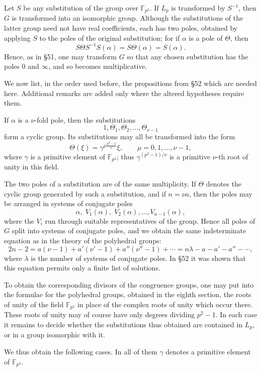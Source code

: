 \documentclass[12pt,a4paper]{article}
\newcommand{\F}{\mathbb F}
\begin{document}
Let \(S\) be any substitution of the group over \(\F_{p^2}\).  If \(L_p\) is transformed by \(S^{-1}\), then \(G\) is transformed into an isomorphic group.  Although the substitutions of the latter group need not have real coefficients, each has two poles, obtained by applying \(S\) to the poles of the original substitution; for if \(\alpha\) is a pole of \(\Theta\), then
\[
 S\Theta S^{-1}S(\alpha)=S\Theta(\alpha)=S(\alpha).
\]
Hence, as in \S 51, one may transform \(G\) so that any chosen substitution has the poles \(0\) and \(\infty\), and so becomes multiplicative.

We now list, in the order used before, the propositions from \S 52 which are needed here.  Additional remarks are added only where the altered hypotheses require them.

If \(\alpha\) is a \(\nu\)-fold pole, then the substitutions
\[
 1,\Theta_1,\Theta_2,\ldots,\Theta_{\nu-1}
\]
form a cyclic group.  Its substitutions may all be transformed into the form
\[
 \Theta(\xi)=\gamma^{\mu\frac{p^2-1}{\nu}}\xi,\qquad
 \mu=0,1,\ldots,\nu-1,
\]
where \(\gamma\) is a primitive element of \(\F_{p^2}\); thus
\(\gamma^{(p^2-1)/\nu}\) is a primitive \(\nu\)-th root of unity in this field.

The two poles of a substitution are of the same multiplicity.  If \(\Theta\) denotes the cyclic group generated by such a substitution, and if \(n=\nu a\), then the poles may be arranged in systems of conjugate poles
\[
 \alpha,\;V_1(\alpha),\;V_2(\alpha),\ldots,V_{a-1}(\alpha),
\]
where the \(V_i\) run through suitable representatives of the group.  Hence all poles of \(G\) split into systems of conjugate poles, and we obtain the same indeterminate equation as in the theory of the polyhedral groups:
\[
 2n-2=a(\nu-1)+a'(\nu'-1)+a''(\nu''-1)+\cdots
      =n\lambda-a-a'-a''-\cdots ,
\]
where \(\lambda\) is the number of systems of conjugate poles.  In \S 52 it was shown that this equation permits only a finite list of solutions.

To obtain the corresponding divisors of the congruence groups, one may put into the formulae for the polyhedral groups, obtained in the eighth section, the roots of unity of the field \(\F_{p^2}\) in place of the complex roots of unity which occur there.  These roots of unity may of course have only degrees dividing \(p^2-1\).  In each case it remains to decide whether the substitutions thus obtained are contained in \(L_p\), or in a group isomorphic with it.

We thus obtain the following cases.  In all of them \(\gamma\) denotes a primitive element of \(\F_{p^2}\).
\end{document}
